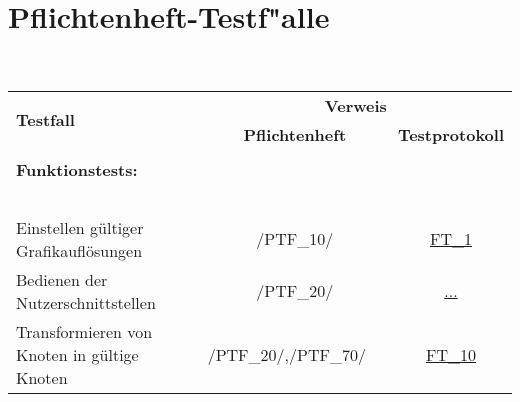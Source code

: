 %



\newpage



\section{Pflichtenheft-Testf{"a}lle}
\label{Abschnitt:Tests:Protokoll:Pflichtenheft-Verweise}

~\\

\begin{longtable}{p{0.5\hsize}p{0.275\hsize}p{0.275\hsize}}


	    \multirow{2}{*}{\textbf{Testfall}}
	  & \multicolumn{2}{c}{\textbf{Verweis}}
	  
	  \\ [14pt]
	  
	  & \multicolumn{1}{c}{\textbf{Pflichtenheft}}
	  & \multicolumn{1}{c}{\textbf{Testprotokoll}}
	  
	  \\ 
	  \\ 
	     


	  \multicolumn{3}{l}{\textbf{Funktionstests:}}
	  
	\\
	
	  \multicolumn{3}{l}{~}
	  
	\\

	  \multicolumn{1}{L{6.5cm}}{Einstellen gültiger Grafikauflösungen}
	& \multicolumn{1}{c}{/PTF\_10/}
	& \multicolumn{1}{c}{\hyperref[FT:1]{FT\_1}}
	
	\\
	
	
	  \multicolumn{1}{L{6.5cm}}{Bedienen der Nutzerschnittstellen}
	& \multicolumn{1}{c}{/PTF\_20/}
	& \multicolumn{1}{c}{\hyperref[]{...}}
		
	\\

	  \multicolumn{1}{L{6.5cm}}{Transformieren von Knoten in gültige Knoten}
	& \multicolumn{1}{C{3cm}}{/PTF\_20/,\newline/PTF\_70/~~}
	& \multicolumn{1}{c}{\hyperref[FT:10]{FT\_10}}
	
	\\
	

\end{longtable}
